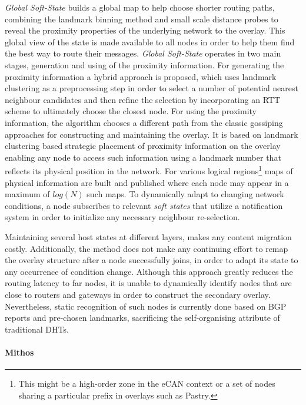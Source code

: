 \documentclass[acmcsur]{acmtrans2m}
\begin{document}
\textit{Global Soft-State} \cite{xu_globstate_2003} builds a global map to help
choose shorter routing paths, combining the landmark binning method and small
scale distance probes to reveal the proximity properties of the underlying
network to the overlay. This global view of the state is made available to all
nodes in order to help them find the best way to route their messages.
\textit{Global Soft-State} operates in two main stages, generation and using of
the proximity information. For generating the proximity information a hybrid
approach is proposed, which uses landmark clustering as a preprocessing step in
order to select a number of potential nearest neighbour candidates and then
refine the selection by incorporating an RTT scheme to ultimately choose the
closest node. For using the proximity information, the algorithm chooses a
different path from the classic gossiping approaches for constructing and
maintaining the overlay. It is based on landmark clustering based strategic
placement of proximity information on the overlay enabling any node to access
such information using a landmark number that reflects its physical position in
the network. For various logical regions\footnote{This might be a high-order
zone in the eCAN\cite{xu_ecan_2002} context or a set of nodes sharing a
particular prefix in overlays such as Pastry.} maps of physical information are
built and published where each node may appear in a maximum of $log\left( N
\right)$ such maps. To dynamically adapt to changing network conditions, a node
subscribes to relevant \emph{soft states} that utilize a notification system in
order to initialize any necessary neighbour re-selection.

Maintaining several host states at different layers, makes any content migration
costly. Additionally, the method does not make any continuing effort to remap the
overlay structure after a node successfully joins, in order to adapt its state to
any occurrence of condition change. Although this approach greatly reduces the
routing latency to far nodes, it is unable to dynamically identify nodes that are
close to routers and gateways in order to construct the secondary overlay.
Nevertheless, static recognition of such nodes is currently done based on BGP
reports and pre-chosen landmarks, sacrificing the self-organising attribute of
traditional DHTs.

\paragraph*{\bf Mithos}
\end{document}
